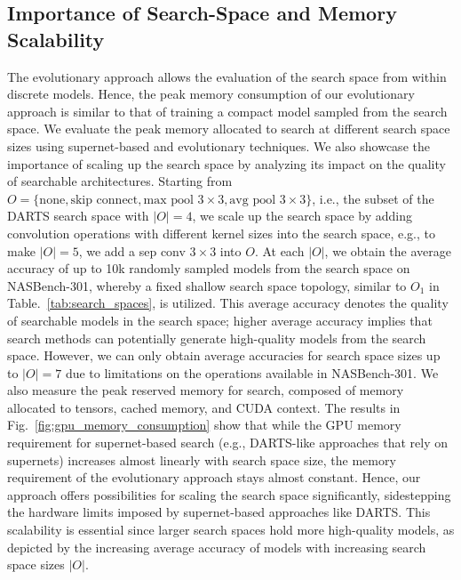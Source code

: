 \documentclass[onecolumn]{IEEEtran}
\begin{document}
\subsection{Importance of Search-Space and Memory Scalability}
The evolutionary approach allows the evaluation of the search space from within discrete models. Hence, the peak memory consumption of our evolutionary approach is similar to that of training a compact model sampled from the search space. We evaluate the peak memory allocated to search at different search space sizes using supernet-based and evolutionary techniques. We also showcase the importance of scaling up the search space by analyzing its impact on the quality of searchable architectures. Starting from \( O = \{ \text{none}, \text{skip connect}, \text{max pool } 3 \times 3, \text{avg pool } 3 \times 3 \} \), i.e., the subset of the DARTS search space with \( |O| = 4 \), we scale up the search space by adding convolution operations with different kernel sizes into the search space, e.g., to make \( |O| = 5 \), we add a sep conv \( 3 \times 3 \) into \( O \). At each \( |O| \), we obtain the average accuracy of up to 10k randomly sampled models from the search space on NASBench-301, whereby a fixed shallow search space topology, similar to \( O_1 \) in Table.~\ref{tab:search_spaces}, is utilized. This average accuracy denotes the quality of searchable models in the search space; higher average accuracy implies that search methods can potentially generate high-quality models from the search space. However, we can only obtain average accuracies for search space sizes up to \( |O| = 7 \) due to limitations on the operations available in NASBench-301. We also measure the peak reserved memory for search, composed of memory allocated to tensors, cached memory, and CUDA context. The results in Fig.~\ref{fig:gpu_memory_consumption} show that while the GPU memory requirement for supernet-based search (e.g., DARTS-like approaches that rely on supernets) increases almost linearly with search space size, the memory requirement of the evolutionary approach stays almost constant. Hence, our approach offers possibilities for scaling the search space significantly, sidestepping the hardware limits imposed by supernet-based approaches like DARTS. This scalability is essential since larger search spaces hold more high-quality models, as depicted by the increasing average accuracy of models with increasing search space sizes \( |O| \).
\end{document}
